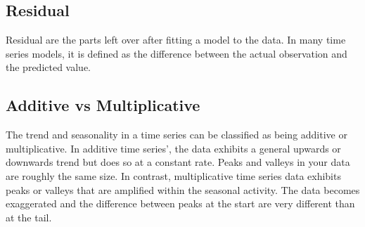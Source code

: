 \documentclass{article}
\begin{document}
  \subsection{Residual}
  Residual are the parts left over after fitting a model to the data. In many time series models, it is defined as the difference between the actual observation and the predicted value.
  
  \subsection{Additive vs Multiplicative}
  The trend and seasonality in a time series can be classified as being additive or multiplicative.
  In additive time series', the data exhibits a general upwards or downwards trend but does so at a constant rate. Peaks and valleys in your data are roughly the same size.
  In contrast, multiplicative time series data exhibits peaks or valleys that are amplified within the seasonal activity. The data becomes exaggerated and the difference between peaks at the start are very different than at the tail.
  
\end{document}
